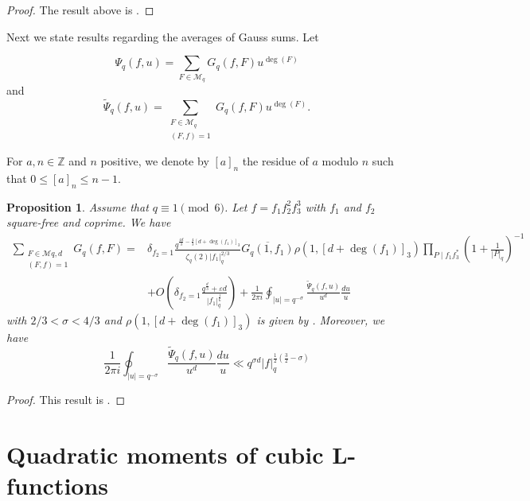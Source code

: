 \documentclass[table]{amsart}
\newtheorem{proposition}[theorem]{Proposition}
\newcommand{\op}[1]{\operatorname{#1}}
\numberwithin{equation}{section}
\begin{document}
\begin{proof}
    The result above is \cite[Proposition 2.13]{DFLCubic}.
\end{proof}

Next we state results regarding the averages of Gauss sums. Let

\[\Psi_{q}(f, u)=\sum_{F \in \mathcal{M}_{q}} G_{q}(f, F) u^{\op{deg}(F)}\]
and
\begin{equation*}
\tilde{\Psi}_{q}(f, u)=\sum_{\substack{F \in \mathcal{M}_{q} \\(F, f)=1}} G_{q}(f, F) u^{\op{deg}(F)}.
\end{equation*}

For $a, n \in \mathbb{Z}$ and $n$ positive, we denote by $[a]_{n}$ the residue of $a$ modulo $n$ such that $0 \leq[a]_{n} \leq n-1$.
\begin{proposition}\label{Gauss average Propn}
    Assume that $q\equiv 1\pmod{6}$. Let $f=f_{1} f_{2}^{2} f_{3}^{3}$ with $f_{1}$ and $f_{2}$ square-free and coprime. We have
$$
\begin{aligned}
\sum_{\substack{F \in \mathcal{M} q, d \\
(F, f)=1}} G_{q}(f, F)= & \delta_{f_{2}=1} \frac{q^{\frac{4 d}{3}-\frac{4}{3}\left[d+\operatorname{deg}\left(f_{1}\right)\right]_{3}}}{\zeta_{q}(2)\left|f_{1}\right|_{q}^{2 / 3}} \overline{G_{q}\left(1, f_{1}\right)} \rho\left(1,\left[d+\operatorname{deg}\left(f_{1}\right)\right]_{3}\right) \prod_{P \mid f_{1} f_{3}^{*}}\left(1+\frac{1}{|P|_{q}}\right)^{-1} \\
& +O\left(\delta_{f_{2}=1} \frac{q^{\frac{d}{3}}+\varepsilon d}{\left|f_{1}\right|_{q}^{\frac{1}{6}}}\right)+\frac{1}{2 \pi i} \oint_{|u|=q^{-\sigma}} \frac{\tilde{\Psi}_{q}(f, u)}{u^{d}} \frac{d u}{u}
\end{aligned}
$$
with $2 / 3<\sigma<4 / 3$ and $\rho\left(1,\left[d+\operatorname{deg}\left(f_{1}\right)\right]_{3}\right)$ is given by \cite[(28)]{DFLCubic}. Moreover, we have
$$
\frac{1}{2 \pi i} \oint_{|u|=q^{-\sigma}} \frac{\tilde{\Psi}_{q}(f, u)}{u^{d}} \frac{d u}{u} \ll q^{\sigma d}|f|_{q}^{\frac{1}{2}\left(\frac{3}{2}-\sigma\right)}
$$
\end{proposition}
\begin{proof}
    This result is \cite[Proposition 3.1]{DFLCubic}.
\end{proof}


\section{Quadratic moments of cubic L-functions}\label{s 3}
\end{document}
